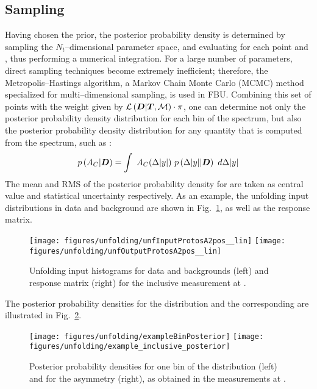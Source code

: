 \subsection{Sampling}
\label{sec:sampling}
Having chosen the prior, the posterior probability density
\conditionalProb{\Truth{}}{\Data{}} is determined by sampling the
$N_t$--dimensional parameter space, and evaluating for each point
\conditionalLhood{\Data{}}{\Truth{}} and \prior{}, thus performing a
numerical integration. For a large number of parameters, direct
sampling techniques become extremely inefficient; therefore, the
Metropolis--Hastings algorithm, a Markov
Chain Monte Carlo (MCMC) method specialized for multi--dimensional
sampling, is used in FBU.
Combining this set of points with the weight given by
$\mathcal{L}\left(\boldsymbol{D}{}|\boldsymbol{T}{},\mathcal{M}{}\right)\cdot{}\pi{}$, one
can determine not only the posterior probability density distribution
for each bin of the spectrum, but also the posterior probability
density distribution for any quantity that is computed from the
spectrum, such as \ac{}:
\begin{equation}
p\left(A_C{}|\boldsymbol{D}{}\right) = 
\int~
A_C{}(\Delta|y|{})~
p\left(\Delta|y|{}|\boldsymbol{D}{}\right)~d\Delta|y|
\end{equation}
The mean and RMS of the posterior probability
density for \ac{} are taken as central value and statistical uncertainty respectively.
As an example, the unfolding input \dy{} distributions in data and
background are shown in Fig.~\ref{fig:unfinput}, as well as the
response matrix.
\begin{figure}[!htb]\centering
  \texttt{[image: figures/unfolding/unfInputProtosA2pos\_\_lin]}
  \texttt{[image: figures/unfolding/unfOutputProtosA2pos\_\_lin]}
  \caption{
    \label{fig:unfinput}
   Unfolding input histograms for data and backgrounds (left) and
   response matrix (right) for the inclusive \ac{} measurement at \eighttev{}.
   }
\end{figure}
%
The posterior probability densities for the \dy{} distribution and the corresponding
\ac{} are illustrated in Fig.~\ref{fig:posteriorIncl}.
%
\begin{figure}[!htb]\centering
  \texttt{[image: figures/unfolding/exampleBinPosterior]}
  \texttt{[image: figures/unfolding/example\_inclusive\_posterior]}
  \caption{
    \label{fig:posteriorIncl}
   Posterior probability densities for one bin of the \dy{}
   distribution (left) and for the asymmetry \ac{} (right), as
   obtained in the \ac{} measurements at \eighttev{}.
   }
\end{figure}

